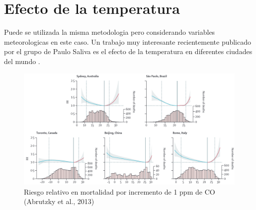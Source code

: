 \documentclass[]{book}
\begin{document}
\hypertarget{efecto-de-la-temperatura}{%
\section{Efecto de la temperatura}\label{efecto-de-la-temperatura}}

Puede se utilizada la misma metodologia pero considerando variables meteorologicas en este caso. Un trabajo muy interesante recientemente publicado por el grupo de Paulo Saliva es el efecto de la temperatura en diferentes ciudades del mundo \citep{GASPARRINI2015369}.

\begin{figure}
\includegraphics[width=18.97in,height=1.8\textheight]{figs/temp1} \caption{Riesgo relativo en mortalidad por incremento de 1 ppm de CO (Abrutzky et al., 2013)}\label{fig:unnamed-chunk-64}
\end{figure}


\end{document}

